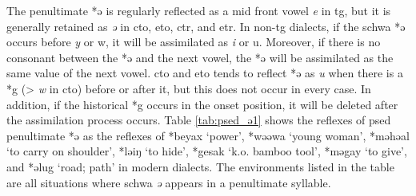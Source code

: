 The penultimate *ə is regularly reflected as a mid front vowel \textit{e} in \acl{tg}, but it is generally retained as \textit{ə} in \acl{cto}, \acl{eto}, \acl{ctr}, and \acl{etr}. In non-\acl{tg} dialects, if the schwa *ə occurs before \textit{y} or {w}, it will be assimilated as \textit{i} or {u}. Moreover, if there is no consonant between the *ə and the next vowel, the *ə will be assimilated as the same value of the next vowel. \acl{cto} and \acl{eto} tends to reflect *ə as \textit{u} when there is a *g (> \textit{w} in \acl{cto}) before or after it, but this does not occur in every case. In addition, if the historical *g occurs in the onset position, it will be deleted after the assimilation process occurs. Table \ref{tab:psed_ə1} shows the reflexes of \acl{psed} penultimate *ə as the reflexes of *beyax `power', *wəəwa `young woman', *məhəal `to carry on shoulder', *ləiŋ `to hide', *gesak `k.o. bamboo tool', *məgay `to give', and *əlug `road; path' in modern dialects. The environments listed in the table are all situations where schwa \textit{ə} appears in a penultimate syllable.

